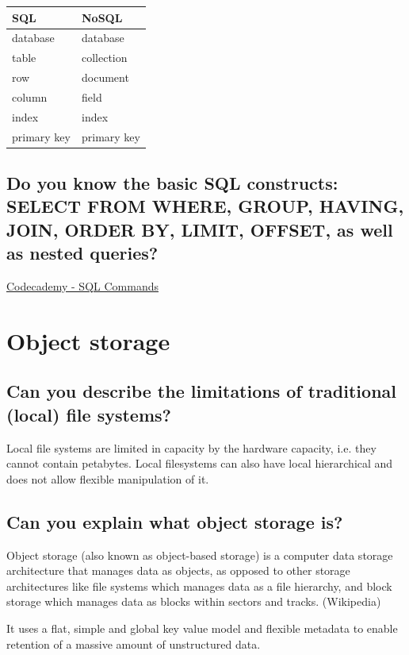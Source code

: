 \documentclass{article}
\begin{document}
\begin{table}[H]
\begin{tabular}{|l|l|}
\hline
\textbf{SQL} & \textbf{NoSQL} \\ \hline
database & database \\ \hline
table & collection \\ \hline
row & document \\ \hline
column & field \\ \hline
index & index \\ \hline
primary key & primary key \\ \hline
\end{tabular}
\end{table}

\subsection{Do you know the basic SQL constructs: SELECT FROM WHERE, GROUP, HAVING, JOIN, ORDER BY, LIMIT, OFFSET, as well as nested queries?}

\href{https://www.codecademy.com/articles/sql-commands}{Codecademy - SQL Commands}



\section{Object storage}
\subsection{Can you describe the limitations of traditional (local) file systems?}

Local file systems are limited in capacity by the hardware capacity, i.e. they cannot contain petabytes. Local filesystems can also have local hierarchical and does not allow flexible manipulation of it.

\subsection{Can you explain what object storage is?}

Object storage (also known as object-based storage) is a computer data storage architecture that manages data as objects, as opposed to other storage architectures like file systems which manages data as a file hierarchy, and block storage which manages data as blocks within sectors and tracks. (Wikipedia)

It uses a flat, simple and global key value model and flexible metadata to enable retention of a massive amount of unstructured data.
\end{document}
